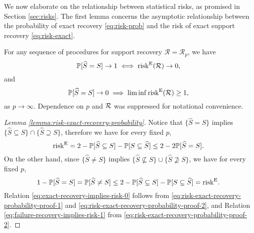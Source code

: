 We now elaborate on the relationship between statistical risks, as promised in Section \ref{sec:risks}.
The first lemma concerns the asymptotic relationship between the probability of exact recovery \eqref{eq:risk-prob} and the risk of exact support recovery \eqref{eq:risk-exact}.

\begin{lemma} \label{lemma:risk-exact-recovery-probability}
For any sequence of procedures for support recovery $\mathcal{R} = \mathcal{R}_p$, we have
\begin{equation} \label{eq:exact-recovery-implies-risk-0}
    \P[\widehat{S} = S] \to 1 \iff \mathrm{risk}^{\mathrm{E}}(\mathcal{R})\to0,
\end{equation}
and
\begin{equation} \label{eq:failure-recovery-implies-risk-1}
    \P[\widehat{S} = S] \to 0 \implies \liminf\mathrm{risk}^{\mathrm{E}}(\mathcal{R})\ge1,
\end{equation}
as $p\to\infty$. Dependence on $p$ and ${\cal R}$ was suppressed for notational convenience.
\end{lemma}


\begin{proof}[Lemma \ref{lemma:risk-exact-recovery-probability}]
Notice that $\{\widehat{S}=S\}$ implies $\{\widehat{S}\subseteq S\} \cap \{\widehat{S}\supseteq S\}$, therefore we have for every fixed $p$,
\begin{equation} \label{eq:risk-exact-recovery-probability-proof-1}
    \mathrm{risk}^{\mathrm{E}} 
    = 2 - \P[\widehat{S} \subseteq S] - \P[S \subseteq \widehat{S}] \\
    \le 2 - 2\P[\widehat{S}=S].
\end{equation}
On the other hand, since $\{\widehat{S}\neq S\}$ implies $\{\widehat{S}\not\subseteq S\} \cup \{\widehat{S}\not\supseteq S\}$, we have for every fixed $p$,
\begin{equation} \label{eq:risk-exact-recovery-probability-proof-2}
    1 - \P[\widehat{S}=S]
    = \P[\widehat{S}\neq S]
    \le 2 - \P[\widehat{S} \subseteq S] - \P[S \subseteq \widehat{S}]
    = \mathrm{risk}^{\mathrm{E}}. 
\end{equation}
Relation \eqref{eq:exact-recovery-implies-risk-0} follows from \eqref{eq:risk-exact-recovery-probability-proof-1} and \eqref{eq:risk-exact-recovery-probability-proof-2}, and Relation \eqref{eq:failure-recovery-implies-risk-1} from \eqref{eq:risk-exact-recovery-probability-proof-2}.
\end{proof}

